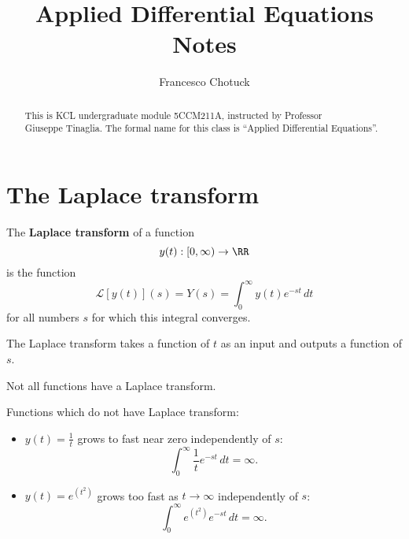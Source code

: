\documentclass[12pt, a4paper]{article}
\title{Applied Differential Equations Notes}
\date{}
\author{Francesco Chotuck}
\newcommand{\CL}{\mathcal{L}}
\begin{document}
\maketitle

\begin{abstract}
    This is KCL undergraduate module 5CCM211A, instructed by Professor \\ Giuseppe Tinaglia. The formal name for this class is ``Applied Differential Equations''.
\end{abstract}

\tableofcontents

\pagebreak

\section{The Laplace transform}

\begin{definition}
    The \textbf{Laplace transform} of a function 
    \[y(t) : [0,\infty) \to \RR\]
    is the function 
    \[\CL[y(t)](s) = Y(s) = \int_{0}^{\infty} y(t) e^{-st} \, dt\]
    for all numbers \(s\) for which this integral converges.
\end{definition}

\begin{mdnote}
    The Laplace transform takes a function of \(t\) as an input and outputs a function of \(s\).
\end{mdnote}

\begin{mdremark}
    Not all functions have a Laplace transform.
\end{mdremark}


\begin{example}
    Functions which do not have Laplace transform: 
    \begin{itemize}
        \item \(y(t) = \frac{1}{t}\) grows to fast near zero independently of \(s\):
        \[\int_{0}^{\infty} \frac{1}{t} e^{-st} \, dt = \infty.\]
        \item \(y(t) = e^{(t^2)}\) grows too fast as \(t \to \infty\) independently of \(s\):
        \[\int_{0}^{\infty} e^{(t^2)} e^{-st} \, dt =\infty.\]
    \end{itemize}
\end{example}
\end{document}
